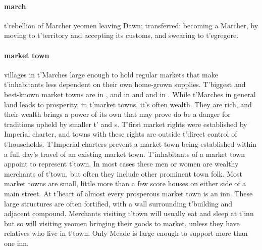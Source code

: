 \paragraph{march} t'\allowbreak rebellion of Marcher yeomen leaving Dawn; transferred: becoming a Marcher, by moving to t'\allowbreak territory and accepting its customs, and swearing to t'\allowbreak egregore.
\paragraph{market town} villages in t'Marches large enough to hold regular markets that make t'inhabitants less dependent on their own home-grown supplies. T'biggest and best-known market towns are  in ,  and  in  and  and  in . While t'Marches in general land leads to prosperity, in t'market towns, it's often wealth. They are rich, and their wealth brings a power of its own that may prove do be a danger for traditions upheld by smaller t' and s. T'\allowbreak first market rights were established by Imperial charter, and towns with these rights are outside t'\allowbreak direct control of t'\allowbreak households. T'\allowbreak Imperial charters prevent a market town being established within a full day's travel of an existing market town. T'\allowbreak inhabitants of a market town appoint  to represent t'\allowbreak town. In most cases these men or women are wealthy merchants of t'\allowbreak town, but often they include other prominent town folk. Most market towns are small, little more than a few score houses on either side of a main street. At t'\allowbreak heart of almost every prosperous market town is an inn. These large structures are often fortified, with a wall surrounding t'\allowbreak building and adjacent compound. Merchants visiting t'\allowbreak town will usually eat and sleep at t'\allowbreak inn but so will visiting yeomen bringing their goods to market, unless they have relatives who live in t'\allowbreak town. Only Meade is large enough to support more than one inn. 
